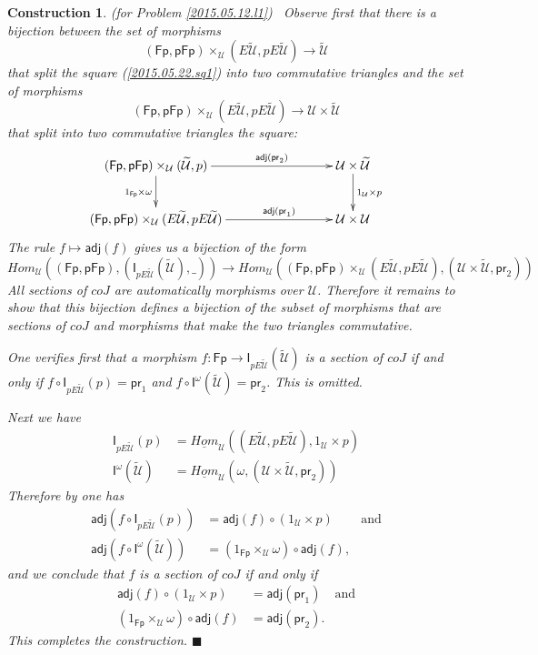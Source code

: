 \documentclass[12pt]{article}
\numberwithin{equation}{section}
\newtheorem{construction0}[proposition]{Construction}
\newenvironment{construction}[1]{\begin{construction0}(for Problem \ref{#1})\ }{$\blacksquare$ \end{construction0}}
\newcommand{\sr}{\rightarrow}
\newcommand{\uu}{\underline}
\newcommand{\iHom}{\uu{Hom}}
\newcommand{\wt}{\widetilde}
\newcommand{\id}{1}            %
\newcommand{\U}{\mathcal{U}}
\newcommand{\I}{\mathsf{I}}
\newcommand{\Fp}{\mathsf{Fp}}
\newcommand{\pFp}{\mathsf{pFp}}
\newcommand{\pr}{\mathsf{pr}}
\newcommand{\adj}{\mathsf{adj}}
\begin{document}
\begin{construction}{2015.05.12.l1}\rm
\label{2015.05.22.constr1} Observe first that there is a bijection between the
set of morphisms
%
$$(\Fp,\pFp)\times_\U(E\wt{\U},pE\wt{\U})\sr \wt{\U}$$
%
that split the square (\ref{2015.05.22.sq1}) into two commutative triangles and
the set of morphisms
%
$$(\Fp,\pFp)\times_\U(E\wt{\U},pE\wt{\U})\sr \U\times\wt{\U}$$
%
that split into two commutative triangles the square:
%
$$
\begin{xy}
          \xymatrix@C=7pc{ (\Fp,\pFp)\times_\U(\wt{\U},p) \ar[r]^-{\adj(\pr_2)}
            \ar[d]_{\id_{\Fp}\times \omega} & \U\times \wt{\U} \ar[d]^{\id_\U\times
              p}\\ (\Fp,\pFp)\times_\U(E\wt{\U},pE\wt{\U}) \ar[r]^-{\adj(\pr_1)} &
            \U\times \U }
\end{xy}
$$
%
The rule $f\mapsto \adj(f)$ gives us a bijection of the form
%
$$Hom_\U((\Fp,\pFp),(\I_{pE\wt{\U}}(\wt{\U}),\_))\sr Hom_\U((\Fp,\pFp)\times_\U
(E\wt{\U},pE\wt{\U}), (\U\times\wt{\U}, \pr_2))$$
%
All sections of $coJ$ are automatically morphisms over $\U$. Therefore it
remains to show that this bijection defines a bijection of the subset of
morphisms that are sections of $coJ$ and morphisms that make the two triangles
commutative.

One verifies first that a morphism $f:\Fp\sr \I_{pE\wt{\U}}(\wt{\U})$ is a section
of $coJ$ if and only if $f\circ \I_{pE\wt{\U}}(p)=\pr_1$ and $f\circ
\I^{\omega}(\wt{\U})=\pr_2$. This is omitted.

Next we have
%
\begin{align*}
  \I_{pE\wt{\U}}(p)&=\iHom_\U((E\wt{\U},pE\wt{\U}),\id_\U\times p) \\
  \I^{\omega}(\wt{\U})&=\iHom_\U(\omega,(\U\times\wt{\U},\pr_2))
\end{align*}
%
Therefore by \cite[Lemma 4.1.7]{presheavesOb} one has
%
\begin{align*}
  \adj(f\circ \I_{pE\wt{\U}}(p))&=\adj(f)\circ (\id_\U\times p) & \text{and} \\
  \adj(f\circ \I^{\omega}(\wt{\U}))&=(\id_{\Fp}\times_{\U}\omega)\circ \adj(f),
\end{align*}
%
and we conclude that $f$ is a section of $coJ$ if and only if
%
\begin{align*}
  \adj(f)\circ (\id_\U\times p)&=\adj(\pr_1) & \text{and} \\
  (\id_{\Fp}\times_{\U}\omega)\circ \adj(f)&=\adj(\pr_2).
\end{align*}
% 
This completes the construction.
\end{construction}
\end{document}
